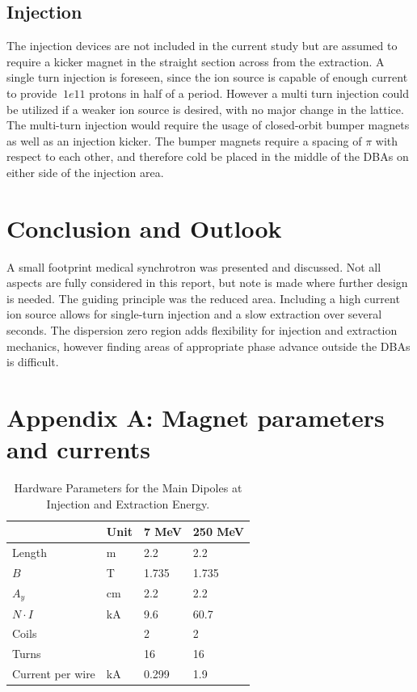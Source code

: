 \subsection{Injection} 
The injection devices are not included in the current study but are assumed to require a kicker magnet in the straight section across from the extraction.  
A single turn injection is foreseen, since the ion source is capable of enough current to provide $~1e11$ protons in half of a period.
However a multi turn injection could be utilized if a weaker ion source is desired, with no major change in the lattice. The
multi-turn injection would require the usage of closed-orbit bumper magnets as well as an injection kicker.  The bumper magnets require a spacing of $\pi$ with respect
to each other, and therefore cold be placed in the middle of the DBAs on either side of the injection area.   
 
\section{Conclusion and Outlook} 
A small footprint medical synchrotron was presented and discussed.  Not all aspects are fully considered in this report, but note is made where further
design is needed.  The guiding principle was the reduced area.  Including a high current ion source allows for single-turn injection and a slow extraction over several
seconds.  The dispersion zero region adds flexibility for injection and extraction mechanics, however finding areas of appropriate phase advance outside the DBAs is 
difficult.  
 
\section{Appendix A: Magnet parameters and currents} 

\begin{table}[]
  \caption{Hardware Parameters for the Main Dipoles at Injection and Extraction Energy.}
  \centering
  \begin{tabular}{@{}llll@{}}
          \toprule
          & \textbf{Unit} & \textbf{7 MeV} & \textbf{250 MeV} \\ 
          \hline \hline

          Length           & m    & 2.2   & 2.2     \\
          $B$              & T    & 1.735 & 1.735   \\
          $A_y$            & cm   & 2.2   & 2.2     \\
          $N \cdot I$      & kA   & 9.6   & 60.7    \\
          Coils            &      & 2     & 2       \\
          Turns            &      & 16    & 16      \\
          Current per wire & kA   & 0.299 & 1.9     \\ \bottomrule
        \end{tabular}
      \end{table}
      \label{tab:bend}


